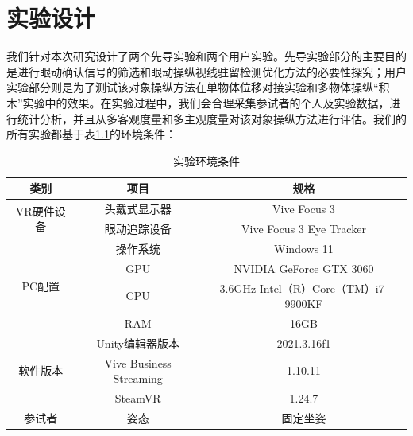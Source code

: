 \chapter{实验设计}

我们针对本次研究设计了两个先导实验和两个用户实验。先导实验部分的主要目的是进行眼动确认信号的筛选和眼动操纵视线驻留检测优化方法的必要性探究；用户实验部分则是为了测试该对象操纵方法在单物体位移对接实验和多物体操纵“积木”实验中的效果。在实验过程中，我们会合理采集参试者的个人及实验数据，进行统计分析，并且从多客观度量和多主观度量对该对象操纵方法进行评估。我们的所有实验都基于表\ref{env}的环境条件：

\begin{table}
\centering
\caption{实验环境条件}
\label{env}
\begin{tabular}{ccc}
\toprule
\textbf{类别}             & \textbf{项目}             & \textbf{规格}                      \\
\midrule
\multirow{2}{*}{VR硬件设备} & 头戴式显示器                  & Vive Focus 3                     \\
                        & 眼动追踪设备                  & Vive Focus 3 Eye Tracker         \\                
\midrule
\multirow{4}{*}{PC配置}   & 操作系统                    & Windows 11                       \\
                        & GPU                     & NVIDIA GeForce GTX 3060          \\
                        & CPU                     & 3.6GHz Intel（R）Core（TM）i7-9900KF \\
                        & RAM                     & 16GB                             \\
\midrule
\multirow{3}{*}{软件版本}   & Unity编辑器版本              & 2021.3.16f1                      \\
                        & Vive Business Streaming & 1.10.11                          \\
                        & SteamVR                 & 1.24.7                           \\
\midrule
参试者                     & 姿态                      & 固定坐姿                            \\
\bottomrule
\end{tabular}
\end{table}

